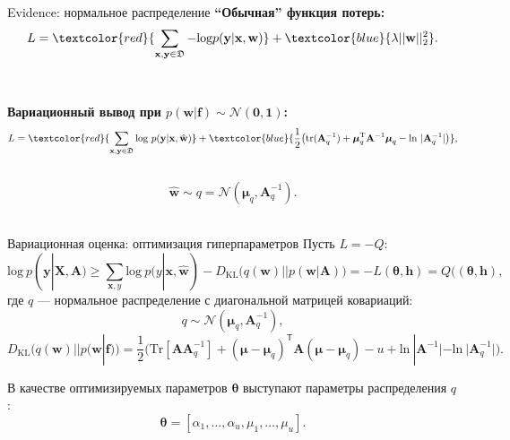 \documentclass[10pt,pdf,utf8,russian,aspectratio=169]{beamer}
\begin{document}
\begin{frame}{Evidence: нормальное распределение}
\textbf{``Обычная'' функция потерь:}\\
$$
L = \textcolor{red}{\sum_{\mathbf{x}, \mathbf{y} \in \mathfrak{D}} - \text{log}p(\mathbf{y}|\mathbf{x}, \mathbf{w})} + \textcolor{blue}{\lambda||\mathbf{w}||_2^2}.
$$\\~\\

\textbf{Вариационный вывод при $p(\mathbf{w}|\mathbf{f}) \sim \mathcal{N}(\mathbf{0}, \mathbf{1})$:}\\
$$
L =   \textcolor{red}{\sum_{\mathbf{x}, \mathbf{y} \in \mathfrak{D}} \text{log}~p(\mathbf{y}|\mathbf{x}, \hat{\mathbf{w}})} +
 \textcolor{blue}{\frac{1}{2} \bigl( \text{tr} (\mathbf{A}^{-1}_q) + \boldsymbol{\mu}_q^\text{T}\mathbf{A}^{-1}\boldsymbol{\mu}_q  - \text{ln}~|\mathbf{A}^{-1}_q| \bigr)},
$$\\$$\hat{\mathbf{w}} \sim q = \mathcal{N}(\boldsymbol{\mu}_q, \mathbf{A}^{-1}_q).$$~\\


\end{frame}

\begin{frame}{Вариационная оценка: оптимизация гиперпараметров}
Пусть $L=-Q$:
\begin{equation} 
\label{eq:elbo}
\text{log}~p(\mathbf{y}|\mathbf{X},\mathbf{A})  
\geq 
\sum_{\mathbf{x},y} \text{log}~p({y}|\mathbf{x}, \hat{\mathbf{w}}) - D_\text{KL}\bigl(q (\mathbf{w}) || p (\mathbf{w}|\mathbf{A})\bigr) = -L(\boldsymbol{\theta}, \mathbf{h}) = Q((\boldsymbol{\theta}, \mathbf{h}),
\end{equation}
где $q$ --- нормальное распределение с диагональной матрицей ковариаций:
\begin{equation}
\label{eq:diag}
	q \sim \mathcal{N}(\boldsymbol{\mu}_q, \mathbf{A}^{-1}_q),
\end{equation}
$$
D_\text{KL}\bigl(q (\mathbf{w}) || p (\mathbf{w}|\mathbf{f})\bigr) = \frac{1}{2} \bigl( \text{Tr} [\mathbf{A}\mathbf{A}^{-1}_q] + (\boldsymbol{\mu} - \boldsymbol{\mu}_q)^\mathsf{T}\mathbf{A}(\boldsymbol{\mu} - \boldsymbol{\mu}_q) - u +\text{ln}~|\mathbf{A}^{-1}| - \text{ln}~|\mathbf{A}_q^{-1}| \bigr).
$$

В качестве оптимизируемых параметров $\boldsymbol{\theta}$ выступают параметры распределения $q$:
\[
\boldsymbol{\theta} = [\alpha_1, \dots, \alpha_u, {\mu}_1,\dots,{\mu}_u].
\]


\end{frame}
\end{document}
